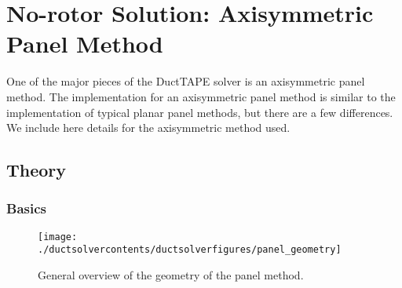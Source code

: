 

\section{No-rotor Solution: Axisymmetric Panel Method}
\label{sec:axisymmetricpanelmethod}

One of the major pieces of the DuctTAPE solver is an axisymmetric panel method.
The implementation for an axisymmetric panel method is similar to the implementation of typical planar panel methods, but there are a few differences.
We include here details for the axisymmetric method used.

\subsection{Theory}
\label{ssec:axisymmetricpaneltheory}

\subsubsection{Basics}

\begin{figure}[h!]
	\centering
	\texttt{[image: ./ductsolvercontents/ductsolverfigures/panel\_geometry]}
	\caption{General overview of the geometry of the panel method.}
	\label{fig:panel_geometry}
\end{figure}





%
%
%
%

